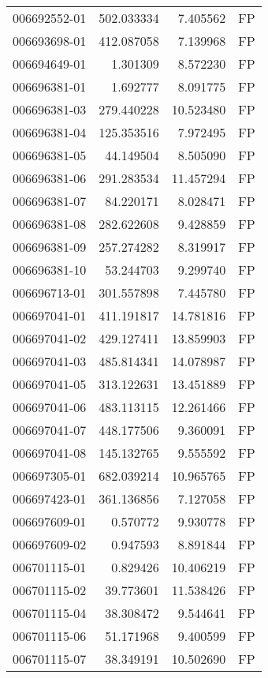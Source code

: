 \begin{tabular}{lrrl}
006692552-01 &  502.033334 &     7.405562 &   FP \\
006693698-01 &  412.087058 &     7.139968 &   FP \\
006694649-01 &    1.301309 &     8.572230 &   FP \\
006696381-01 &    1.692777 &     8.091775 &   FP \\
006696381-03 &  279.440228 &    10.523480 &   FP \\
006696381-04 &  125.353516 &     7.972495 &   FP \\
006696381-05 &   44.149504 &     8.505090 &   FP \\
006696381-06 &  291.283534 &    11.457294 &   FP \\
006696381-07 &   84.220171 &     8.028471 &   FP \\
006696381-08 &  282.622608 &     9.428859 &   FP \\
006696381-09 &  257.274282 &     8.319917 &   FP \\
006696381-10 &   53.244703 &     9.299740 &   FP \\
006696713-01 &  301.557898 &     7.445780 &   FP \\
006697041-01 &  411.191817 &    14.781816 &   FP \\
006697041-02 &  429.127411 &    13.859903 &   FP \\
006697041-03 &  485.814341 &    14.078987 &   FP \\
006697041-05 &  313.122631 &    13.451889 &   FP \\
006697041-06 &  483.113115 &    12.261466 &   FP \\
006697041-07 &  448.177506 &     9.360091 &   FP \\
006697041-08 &  145.132765 &     9.555592 &   FP \\
006697305-01 &  682.039214 &    10.965765 &   FP \\
006697423-01 &  361.136856 &     7.127058 &   FP \\
006697609-01 &    0.570772 &     9.930778 &   FP \\
006697609-02 &    0.947593 &     8.891844 &   FP \\
006701115-01 &    0.829426 &    10.406219 &   FP \\
006701115-02 &   39.773601 &    11.538426 &   FP \\
006701115-04 &   38.308472 &     9.544641 &   FP \\
006701115-06 &   51.171968 &     9.400599 &   FP \\
006701115-07 &   38.349191 &    10.502690 &   FP \\

\end{tabular}
